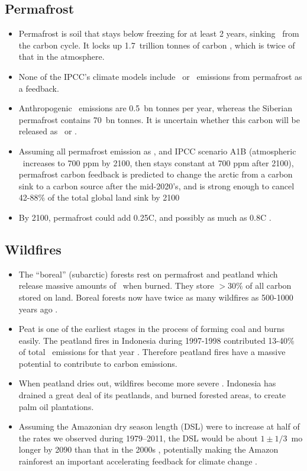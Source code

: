 \documentclass[11pt]{article}
\begin{document}
\subsection{Permafrost}
\begin{itemize}
\item Permafrost is soil that stays below freezing for at least 2 years, sinking \cotwo\ from the carbon cycle. It locks up 1.7~trillion tonnes of carbon \cite{Tarnocai09}, which is twice of that in the atmosphere.
\item None of the IPCC's climate models include \cotwo\ or \meth\ emissions from permafrost as a feedback.
\item Anthropogenic \meth\ emissions are 0.5~bn tonnes per year, whereas the Siberian permafrost contains 70~bn tonnes. It is uncertain whether this carbon will be released as \meth\ or \cotwo. 
\item Assuming all permafrost emission as \cotwo, and IPCC scenario A1B \cite{IPCC07} (atmospheric \cotwo\ increases to
700 ppm by 2100, then stays constant at 700 ppm after 2100), permafrost carbon feedback is predicted to change the arctic from a carbon sink to a carbon source after the mid-2020's, and is strong enough to cancel 42-88\% of the total global land sink by 2100 \cite{Schaefer11} 
\item By 2100, permafrost could add 0.25\textdegree{}C, and possibly as much as 0.8\textdegree{}C \cite{Macdougall12}.
\end{itemize}

\subsection{Wildfires}
\begin{itemize}
\item The ``boreal'' (subarctic) forests rest on permafrost and peatland which release massive amounts of \cotwo\ when burned. They store $>30\%$ of all carbon stored on land. Boreal forests now have twice as many wildfires as 500-1000 years ago \cite{Kelly13}.
\item Peat is one of the earliest stages in the process of forming coal and burns easily. The peatland fires in Indonesia during 1997-1998 contributed 13-40\% of total \cotwo\ emissions for that year \cite{Page02}. Therefore peatland fires have a massive potential to contribute to carbon emissions.
\item When peatland dries out, wildfires become more severe \cite{Turetsky11}. Indonesia has drained a great deal of its peatlands, and burned forested areas, to create palm oil plantations.
\item Assuming the Amazonian dry season length (DSL) were to increase at half of the rates we observed during 1979--2011, the DSL would be about $1 \pm 1/3$~mo longer by 2090 than that in the 2000s \cite{Fu13}, potentially making the Amazon rainforest an important accelerating feedback for climate change \cite{Romm18}.
\end{itemize}
\end{document}
